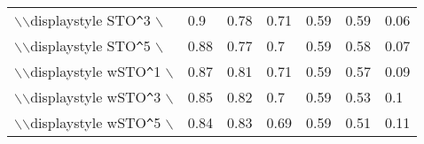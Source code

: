 \begin{table}[ht]
\begin{tabular}{lllllll}
  $\backslash$$\backslash$displaystyle STO\verb|^|3 $\backslash$} & {\color[HTML]{00D768} 0.9} & {\color[HTML]{EF2A00} 0.78} & {\color[HTML]{0051D7} 0.71} & {\color{orange} 0.59} & {\color[HTML]{6200D7} 0.59} & {\color[HTML]{9B9B9B} 0.06} \\ 
  $\backslash$$\backslash$displaystyle STO\verb|^|5 $\backslash$} & {\color[HTML]{00D768} 0.88} & {\color[HTML]{EF2A00} 0.77} & {\color[HTML]{0051D7} 0.7} & {\color[HTML]{6200D7} 0.59} & {\color{orange} 0.58} & {\color[HTML]{9B9B9B} 0.07} \\ 
  $\backslash$$\backslash$displaystyle wSTO\verb|^|1 $\backslash$} & {\color[HTML]{00D768} 0.87} & {\color[HTML]{EF2A00} 0.81} & {\color[HTML]{0051D7} 0.71} & {\color[HTML]{6200D7} 0.59} & {\color{orange} 0.57} & {\color[HTML]{9B9B9B} 0.09} \\ 
  $\backslash$$\backslash$displaystyle wSTO\verb|^|3 $\backslash$} & {\color[HTML]{00D768} 0.85} & {\color[HTML]{EF2A00} 0.82} & {\color[HTML]{0051D7} 0.7} & {\color[HTML]{6200D7} 0.59} & {\color{orange} 0.53} & {\color[HTML]{9B9B9B} 0.1} \\ 
  $\backslash$$\backslash$displaystyle wSTO\verb|^|5 $\backslash$} & {\color[HTML]{00D768} 0.84} & {\color[HTML]{EF2A00} 0.83} & {\color[HTML]{0051D7} 0.69} & {\color[HTML]{6200D7} 0.59} & {\color{orange} 0.51} & {\color[HTML]{9B9B9B} 0.11} \\ 
   \hline
\end{tabular}
\end{table}
